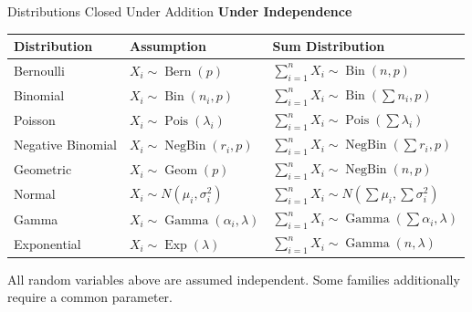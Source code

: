 \begin{frame}{Distributions Closed Under Addition \textbf{Under Independence}}

\begin{center}
\small
\renewcommand{\arraystretch}{1.45}
\begin{tabular}{lll}
\toprule
\textbf{Distribution} & \textbf{Assumption} & \textbf{Sum Distribution} \\
\midrule

Bernoulli &
$X_i\sim \operatorname{Bern}(p)$ &
$\displaystyle \sum_{i=1}^n X_i
\sim \operatorname{Bin}(n,p)$
\\

Binomial &
$X_i\sim \operatorname{Bin}(n_i,p)$ &
$\displaystyle \sum_{i=1}^n X_i
\sim
\operatorname{Bin}\!\left(\sum n_i,p\right)$
\\

Poisson &
$X_i\sim \operatorname{Pois}(\lambda_i)$ &
$\displaystyle \sum_{i=1}^n X_i
\sim
\operatorname{Pois}\!\left(\sum \lambda_i\right)$
\\

Negative Binomial &
$X_i\sim \operatorname{NegBin}(r_i,p)$ &
$\displaystyle \sum_{i=1}^n X_i
\sim
\operatorname{NegBin}\!\left(\sum r_i,p\right)$
\\

Geometric &
$X_i\sim \operatorname{Geom}(p)$ &
$\displaystyle \sum_{i=1}^n X_i
\sim
\operatorname{NegBin}(n,p)$
\\

Normal &
$X_i\sim N(\mu_i,\sigma_i^2)$ &
$\displaystyle \sum_{i=1}^n X_i
\sim
N\!\left(\sum \mu_i,\sum \sigma_i^2\right)$
\\

Gamma &
$X_i\sim \operatorname{Gamma}(\alpha_i,\lambda)$ &
$\displaystyle \sum_{i=1}^n X_i
\sim
\operatorname{Gamma}\!\left(\sum \alpha_i,\lambda\right)$
\\

Exponential &
$X_i\sim \operatorname{Exp}(\lambda)$ &
$\displaystyle \sum_{i=1}^nX_i
\sim
\operatorname{Gamma}(n,\lambda)$
\\

\bottomrule
\end{tabular}
\end{center}

\vspace{0.2cm}

\small
All random variables above are assumed independent.
Some families additionally require a common parameter.

\end{frame}



